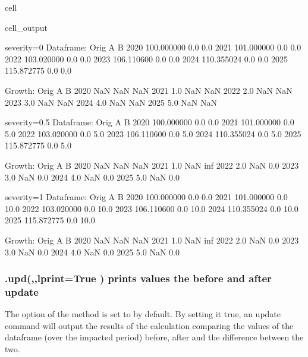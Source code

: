\documentclass[letterpaper,10pt,english]{jupyterBook}
\begin{document}
\begin{sphinxuseclass}{cell}
\begin{sphinxVerbatimOutput}
\begin{sphinxuseclass}{cell_output}
\begin{sphinxVerbatim}[commandchars=\\\{\}]
severity=0
Dataframe:
            Orig    A    B
2020  100.000000  0.0  0.0
2021  101.000000  0.0  0.0
2022  103.020000  0.0  0.0
2023  106.110600  0.0  0.0
2024  110.355024  0.0  0.0
2025  115.872775  0.0  0.0

Growth:
      Orig   A   B
2020   NaN NaN NaN
2021   1.0 NaN NaN
2022   2.0 NaN NaN
2023   3.0 NaN NaN
2024   4.0 NaN NaN
2025   5.0 NaN NaN


severity=0.5
Dataframe:
            Orig    A    B
2020  100.000000  0.0  0.0
2021  101.000000  0.0  5.0
2022  103.020000  0.0  5.0
2023  106.110600  0.0  5.0
2024  110.355024  0.0  5.0
2025  115.872775  0.0  5.0

Growth:
      Orig   A    B
2020   NaN NaN  NaN
2021   1.0 NaN  inf
2022   2.0 NaN  0.0
2023   3.0 NaN  0.0
2024   4.0 NaN  0.0
2025   5.0 NaN  0.0


severity=1
Dataframe:
            Orig    A     B
2020  100.000000  0.0   0.0
2021  101.000000  0.0  10.0
2022  103.020000  0.0  10.0
2023  106.110600  0.0  10.0
2024  110.355024  0.0  10.0
2025  115.872775  0.0  10.0

Growth:
      Orig   A    B
2020   NaN NaN  NaN
2021   1.0 NaN  inf
2022   2.0 NaN  0.0
2023   3.0 NaN  0.0
2024   4.0 NaN  0.0
2025   5.0 NaN  0.0
\end{sphinxVerbatim}

\end{sphinxuseclass}\end{sphinxVerbatimOutput}

\end{sphinxuseclass}

\subsubsection{.upd(,,lprint=True ) prints values the before and after update}
\label{\detokenize{content/04_PythonEssentials/UpdateCommand:upd-lprint-true-prints-values-the-before-and-after-update}}
\sphinxAtStartPar
The  option of the method  is set to  by default.  By setting it true, an update command will output the results of the calculation comparing the values of the dataframe (over the impacted period) before, after and the difference between the two.
\end{document}
